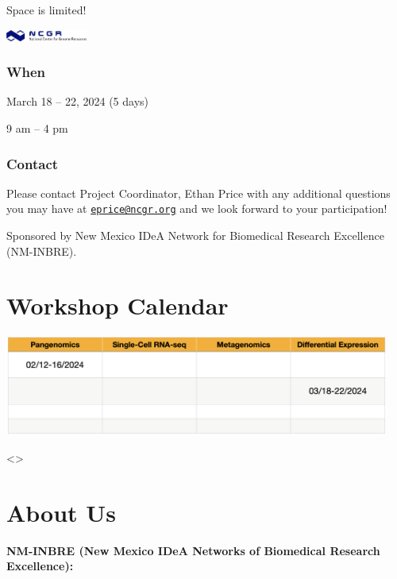 \documentclass[
]{book}
\begin{document}
Space is limited!

\includegraphics[width=0.2\textwidth,height=\textheight]{./Figures/ncgr.png}

\hypertarget{when}{%
\subsection*{When}\label{when}}

March 18 -- 22, 2024 (5 days)

9 am -- 4 pm

\hypertarget{contact}{%
\subsection*{Contact}\label{contact}}

Please contact Project Coordinator, Ethan Price with any additional questions you may have at \href{mailto:eprice@ncgr.org}{\nolinkurl{eprice@ncgr.org}} and we look forward to your participation!

Sponsored by New Mexico IDeA Network for Biomedical Research Excellence (NM-INBRE).

\hypertarget{workshop-calendar}{%
\chapter*{Workshop Calendar}\label{workshop-calendar}}

\includegraphics[width=0.95\textwidth,height=\textheight]{./Figures/WSDates.png}

\textless{}\textgreater{}

\hypertarget{about-us}{%
\chapter*{About Us}\label{about-us}}

\textbf{NM-INBRE (New Mexico IDeA Networks of Biomedical Research Excellence):}
\end{document}
